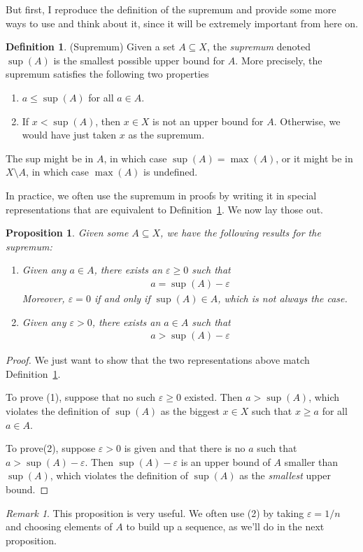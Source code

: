 \documentclass[12pt]{article}
\numberwithin{equation}{section} %
\theoremstyle{plain}
\newtheorem{prop}[thm]{Proposition}
\theoremstyle{definition}
\newtheorem{defn}[thm]{Definition}
\theoremstyle{remark}
\newtheorem*{rmk}{Remark}
\begin{document}
But first, I reproduce the definition of the supremum and provide some
more ways to use and think about it, since it will be extremely
important from here on.

\begin{defn}{(Supremum)}
\label{defn:supdef2}
Given a set $A\subseteq X$, the \emph{supremum} denoted $\sup(A)$ is the
smallest possible upper bound for $A$.
More precisely, the supremum satisfies the following two properties
\begin{enumerate}
  \item $a\leq \sup(A)$ for all $a\in A$.
  \item If $x<\sup(A)$, then $x\in X$ is not an upper bound for $A$.
    Otherwise, we would have just taken $x$ as the supremum.
\end{enumerate}
The sup might be in $A$, in which case $\sup(A) = \max(A)$, or it might
be in $X\setminus A$, in which case $\max(A)$ is undefined.
\end{defn}

In practice, we often use the supremum in proofs by writing it in
special representations that are equivalent to
Definition~\ref{defn:supdef2}. We now lay those out.
\begin{prop}
Given some $A\subseteq X$, we have the following results for the
supremum:
\begin{enumerate}
  \item Given any $a\in A$, there exists an $\varepsilon\geq 0$ such
    that
    \begin{align*}
      a = \sup(A) - \varepsilon
    \end{align*}
    Moreover, $\varepsilon=0$ if and only if $\sup(A) \in A$, which is
    not always the case.
  \item Given any $\varepsilon>0$, there exists an $a\in A$ such that
    \begin{align*}
      a > \sup(A) -\varepsilon
    \end{align*}
\end{enumerate}
\end{prop}
\begin{proof}
We just want to show that the two representations above match
Definition~\ref{defn:supdef2}.

To prove (1), suppose that no such $\varepsilon\geq 0$ existed. Then $a
> \sup(A)$, which violates the definition of $\sup(A)$ as the biggest
$x\in X$ such that $x\geq a$ for all $a\in A$.

To prove(2), suppose $\varepsilon>0$ is given and that there is no $a$
such that $a>\sup(A)-\varepsilon$. Then $\sup(A)-\varepsilon$ is an
upper bound of $A$ smaller than $\sup(A)$, which violates the definition
of $\sup(A)$ as the \emph{smallest} upper bound.
\end{proof}
\begin{rmk}
This proposition is very useful. We often use (2) by taking
$\varepsilon=1/n$ and choosing elements of $A$ to build up a sequence,
as we'll do in the next proposition.
\end{rmk}
\end{document}
